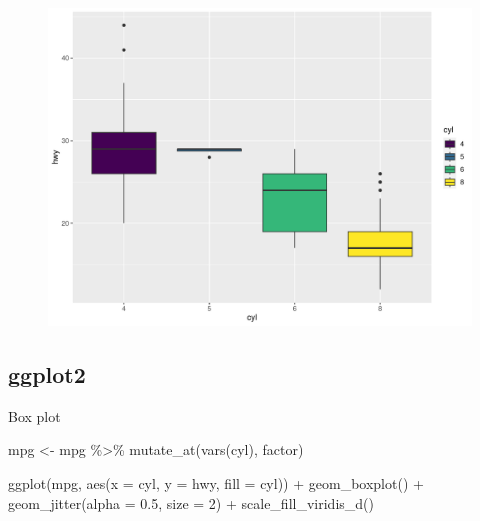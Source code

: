 \documentclass[
  letterpaper,
  DIV=11,
  numbers=noendperiod,
  landscape]{scrartcl}
\newenvironment{Shaded}{\begin{snugshade}}{\end{snugshade}}
\newcommand{\AttributeTok}[1]{\textcolor[rgb]{0.40,0.45,0.13}{#1}}
\newcommand{\DecValTok}[1]{\textcolor[rgb]{0.68,0.00,0.00}{#1}}
\newcommand{\FloatTok}[1]{\textcolor[rgb]{0.68,0.00,0.00}{#1}}
\newcommand{\FunctionTok}[1]{\textcolor[rgb]{0.28,0.35,0.67}{#1}}
\newcommand{\NormalTok}[1]{\textcolor[rgb]{0.00,0.23,0.31}{#1}}
\newcommand{\OtherTok}[1]{\textcolor[rgb]{0.00,0.23,0.31}{#1}}
\newcommand{\SpecialCharTok}[1]{\textcolor[rgb]{0.37,0.37,0.37}{#1}}
\begin{document}
\begin{figure}[H]

{\centering \includegraphics{RandRStudio_files/figure-pdf/unnamed-chunk-17-1.pdf}

}

\end{figure}

\hypertarget{ggplot2-7}{%
\subsection{ggplot2}\label{ggplot2-7}}

Box plot

\begin{Shaded}
\begin{Highlighting}[]
\NormalTok{mpg }\OtherTok{\textless{}{-}}\NormalTok{ mpg }\SpecialCharTok{\%\textgreater{}\%} \FunctionTok{mutate\_at}\NormalTok{(}\FunctionTok{vars}\NormalTok{(cyl), factor)}

\FunctionTok{ggplot}\NormalTok{(mpg, }\FunctionTok{aes}\NormalTok{(}\AttributeTok{x =}\NormalTok{ cyl, }\AttributeTok{y =}\NormalTok{ hwy, }\AttributeTok{fill =}\NormalTok{ cyl)) }\SpecialCharTok{+}
  \FunctionTok{geom\_boxplot}\NormalTok{() }\SpecialCharTok{+}
  \FunctionTok{geom\_jitter}\NormalTok{(}\AttributeTok{alpha =} \FloatTok{0.5}\NormalTok{, }\AttributeTok{size =} \DecValTok{2}\NormalTok{) }\SpecialCharTok{+}
  \FunctionTok{scale\_fill\_viridis\_d}\NormalTok{()}
\end{Highlighting}
\end{Shaded}
\end{document}
